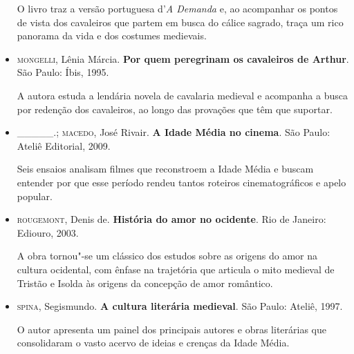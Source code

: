 \documentclass[11pt]{extarticle}
\begin{document}
\begin{itemize}
  O livro traz a versão portuguesa d'\emph{A Demanda} e, ao acompanhar
  os pontos de vista dos cavaleiros que partem em busca do cálice
  sagrado, traça um rico panorama da vida e dos costumes medievais.

\item\textsc{mongelli}, Lênia Márcia. \textbf{Por quem peregrinam os cavaleiros de
Arthur}. São Paulo: Íbis, 1995.

  A autora estuda a lendária novela de cavalaria medieval e acompanha a
  busca por redenção dos cavaleiros, ao longo das provações que têm que
  suportar.

\item\_\_\_\_\_.; \textsc{macedo}, José Rivair. \textbf{A Idade Média no cinema}. São
Paulo: Ateliê Editorial, 2009.

  Seis ensaios analisam filmes que reconstroem a Idade Média e buscam
  entender por que esse período rendeu tantos roteiros cinematográficos
  e apelo popular.

\item\textsc{rougemont}, Denis de. \textbf{História do amor no ocidente}. Rio de
Janeiro: Ediouro, 2003.

  A obra tornou"-se um clássico dos estudos sobre as origens do amor na
  cultura ocidental, com ênfase na trajetória que articula o mito
  medieval de Tristão e Isolda às origens da concepção de amor
  romântico.

\item\textsc{spina}, Segismundo. \textbf{A cultura literária medieval}. São Paulo:
Ateliê, 1997.

  O autor apresenta um painel dos principais autores e obras literárias
  que consolidaram o vasto acervo de ideias e crenças da Idade Média.
\end{itemize}
\end{document}
